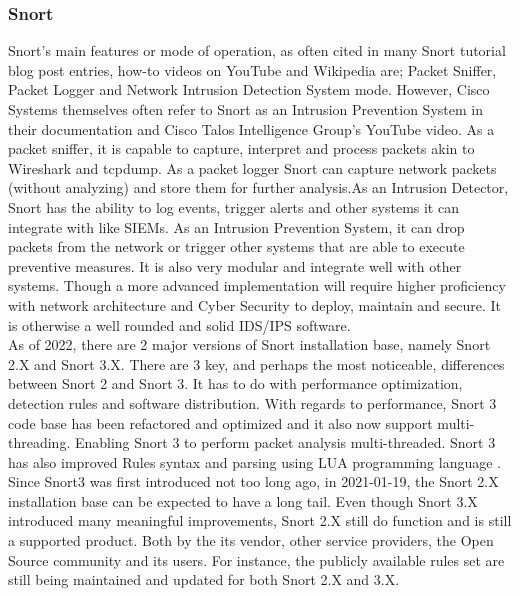 
\subsubsection{Snort}

Snort's main features or mode of operation, as often cited in many Snort tutorial blog post entries, how-to videos on YouTube and Wikipedia are; Packet Sniffer, Packet Logger and Network Intrusion Detection System mode. However, Cisco Systems themselves often refer to Snort as an Intrusion Prevention System in their documentation and Cisco Talos Intelligence Group's YouTube video. As a packet sniffer, it is capable to capture, interpret and process packets akin to Wireshark and tcpdump. As a packet logger Snort can capture network packets (without analyzing) and store them for further analysis.As an Intrusion Detector, Snort has the ability to log events, trigger alerts and other systems it can integrate with like SIEMs. As an Intrusion Prevention System, it can drop packets from the network or trigger other systems that are able to execute preventive measures. It is also very modular and integrate well with other systems. Though a more advanced implementation will require higher proficiency with network architecture and Cyber Security to deploy, maintain and secure. It is otherwise a well rounded and solid IDS/IPS software.\\

As of 2022, there are 2 major versions of Snort installation base, namely Snort 2.X and Snort 3.X. There are 3 key, and perhaps the most noticeable, differences between Snort 2 and Snort 3. It has to do with performance optimization, detection rules and software distribution. With regards to performance, Snort 3 code base has been refactored and optimized and it also now support multi-threading. Enabling Snort 3 to perform packet analysis multi-threaded. Snort 3 has also improved Rules syntax and parsing using LUA programming language \cite{Snort2020_MunshawJ}. Since Snort3 was first introduced not too long ago, in 2021-01-19, the Snort 2.X installation base can be expected to have a long tail. Even though Snort 3.X introduced many meaningful improvements, Snort 2.X still do function and is still a supported product. Both by the its vendor, other service providers, the Open Source community and its users. For instance, the publicly available rules set are still being maintained and updated for both Snort 2.X and 3.X. 

